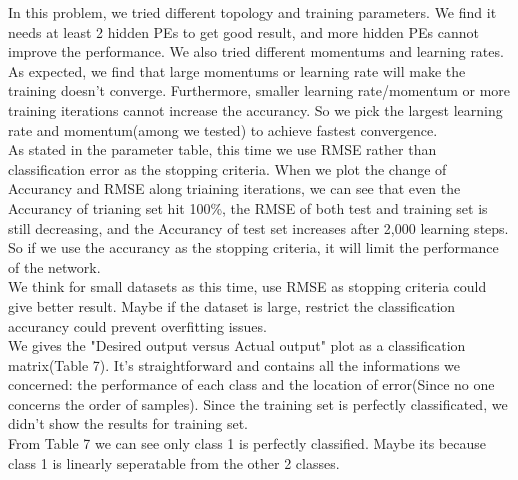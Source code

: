 \documentclass[epsfig]{article}
\def\spar{\vskip10pt}
\begin{document}
		
In this problem, we tried different topology and training parameters. We find it needs at least 2 hidden PEs to get good result, and more hidden PEs cannot improve the performance. We also tried different momentums and learning rates. As expected, we find that large momentums or learning rate will make the training doesn't converge. Furthermore, smaller learning rate/momentum or more training iterations cannot increase the accurancy. So we pick the largest learning rate and momentum(among we tested) to achieve fastest convergence.\\
\spar
As stated in the parameter table, this time we use RMSE rather than  classification error as the stopping criteria. When we plot the change of Accurancy and RMSE along triaining iterations, we can see that even the Accurancy of trianing set hit 100\%, the RMSE of both test and training set is still decreasing, and the Accurancy of test set increases after 2,000 learning steps. So if we use the accurancy as the stopping criteria, it will limit the performance of the network.\\
\spar
We think for small datasets as this time, use RMSE as stopping criteria could give better result. Maybe if the dataset is large, restrict the classification accurancy could prevent overfitting issues.\\
\spar
We gives the "Desired output versus Actual output" plot as a classification matrix(Table 7). It's straightforward and contains all the informations we concerned: the performance of each class and the location of error(Since no one concerns the order of samples). Since the training set is perfectly classificated, we didn't show the results for training set.\\
\spar
From Table 7 we can see only class 1 is perfectly classified. Maybe its because class 1 is linearly seperatable from the other 2 classes.
 
\end{document}
